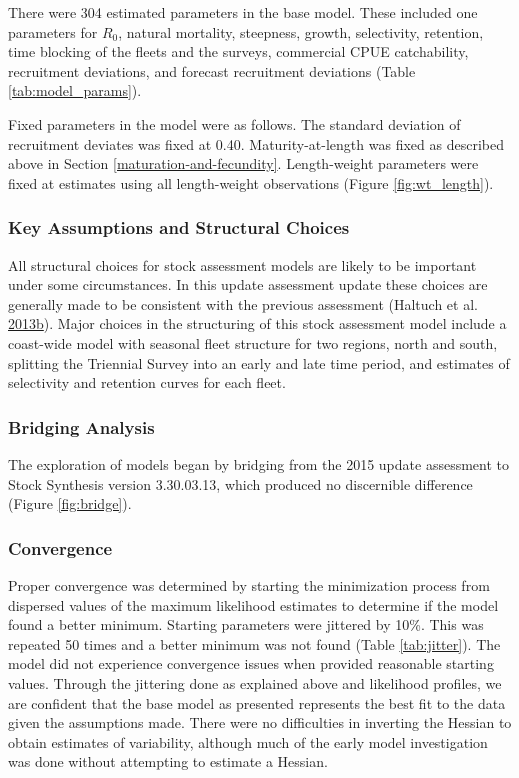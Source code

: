 \documentclass[12pt,]{article}
\begin{document}
There were 304 estimated parameters in the base model. These included
one parameters for \(R_0\), natural mortality, steepness, growth,
selectivity, retention, time blocking of the fleets and the surveys,
commercial CPUE catchability, recruitment deviations, and forecast
recruitment deviations (Table \ref{tab:model_params}).

Fixed parameters in the model were as follows. The standard deviation of
recruitment deviates was fixed at 0.40. Maturity-at-length was fixed as
described above in Section \ref{maturation-and-fecundity}. Length-weight
parameters were fixed at estimates using all length-weight observations
(Figure \ref{fig:wt_length}).

\subsubsection{Key Assumptions and Structural
Choices}\label{key-assumptions-and-structural-choices}

All structural choices for stock assessment models are likely to be
important under some circumstances. In this update assessment update
these choices are generally made to be consistent with the previous
assessment (Haltuch et al.
\protect\hyperlink{ref-haltuch_status_2013}{2013}\protect\hyperlink{ref-haltuch_status_2013}{b}).
Major choices in the structuring of this stock assessment model include
a coast-wide model with seasonal fleet structure for two regions, north
and south, splitting the Triennial Survey into an early and late time
period, and estimates of selectivity and retention curves for each
fleet.

\subsubsection{Bridging Analysis}\label{bridging-analysis}

The exploration of models began by bridging from the 2015 update
assessment to Stock Synthesis version 3.30.03.13, which produced no
discernible difference (Figure \ref{fig:bridge}).

\subsubsection{Convergence}\label{convergence}

Proper convergence was determined by starting the minimization process
from dispersed values of the maximum likelihood estimates to determine
if the model found a better minimum. Starting parameters were jittered
by 10\%. This was repeated 50 times and a better minimum was not found
(Table \ref{tab:jitter}). The model did not experience convergence
issues when provided reasonable starting values. Through the jittering
done as explained above and likelihood profiles, we are confident that
the base model as presented represents the best fit to the data given
the assumptions made. There were no difficulties in inverting the
Hessian to obtain estimates of variability, although much of the early
model investigation was done without attempting to estimate a Hessian.
\end{document}
